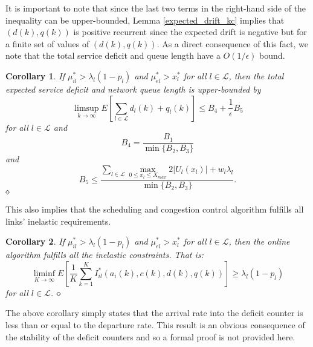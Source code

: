 \documentclass[conference]{IEEEtran}
\newtheorem{corollary}{Corollary}
\begin{document}
It is important to note that since the last two terms in the right-hand side of the inequality can be upper-bounded, Lemma \ref{expected_drift_kc} implies that $(d(k),q(k))$ is positive recurrent since the expected drift is negative but for a finite set of values of $(d(k),q(k))$. As a direct consequence of this fact, we note that the total service deficit and queue length have a $O(1 / \epsilon)$ bound.

\begin{corollary}
\label{def_queue_bound_kc}
If $\mu^*_{il} > \lambda_l(1-p_l)$ and $\mu^*_{el} > x_l^*$ for all $l \in \mathcal{L}$, then the total expected service deficit and network queue length is upper-bounded by
\begin{equation*}
	\limsup_{k \rightarrow \infty} E\left[ \sum_{l \in \mathcal{L}} d_l(k)+q_l(k) \right] \leq B_4 + \frac{1}{\epsilon} B_5
\end{equation*}
for all $l \in \mathcal{L}$ and
\begin{equation*}
	B_4 = \frac{B_1}{ \min \{ B_2, B_3 \} }
\end{equation*}
and
\begin{equation*}
	B_5 \leq \frac{ \sum_{l \in \mathcal{L}} \max_{ 0 \leq x_l \leq X_{max} } 2 |U_l(x_l)| + w_l \lambda_l }{ \min \{ B_2, B_3 \} }.
\end{equation*}
$\hfill \diamond$
\end{corollary}

This also implies that the scheduling and congestion control algorithm fulfills all links' inelastic requirements.
\begin{corollary}
If $\mu^*_{il} > \lambda_l(1-p_l)$ and $\mu^*_{el} > x_l^*$ for all $l \in \mathcal{L}$, then the online algorithm fulfills all the inelastic constraints. That is:
\begin{equation*}
	\liminf_{K \rightarrow \infty} E \left[ \frac{1}{K} \sum_{k=1}^{K} I_{il}^*(a_i(k),c(k),d(k),q(k)) \right] \geq \lambda_l(1-p_l)
\end{equation*}
for all $l \in \mathcal{L}$.
$\hfill \diamond$
\end{corollary}

The above corollary simply states that the arrival rate into the deficit counter is less than or equal to the departure rate. This result is an obvious consequence of the stability of the deficit counters and so a formal proof is not provided here.
\end{document}
